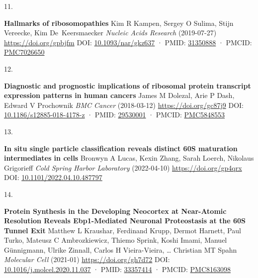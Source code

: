 \documentclass[
]{article}
\newlength{\cslhangindent}
\newlength{\csllabelwidth}
\newlength{\cslentryspacingunit} %
\newenvironment{CSLReferences}[2] %
 {%
  \setlength{\parindent}{0pt}
  \ifodd #1
  \let\oldpar\par
  \def\par{\hangindent=\cslhangindent\oldpar}
  \fi
  \setlength{\parskip}{#2\cslentryspacingunit}
 }%
 {}
\newcommand{\CSLBlock}[1]{#1\hfill\break}
\newcommand{\CSLLeftMargin}[1]{\parbox[t]{\csllabelwidth}{#1}}
\newcommand{\CSLRightInline}[1]{\parbox[t]{\linewidth - \csllabelwidth}{#1}\break}
\providecommand{\DIFaddbegin}{} %
\providecommand{\DIFaddend}{} %
\providecommand{\DIFdelbegin}{} %
\providecommand{\DIFdelend}{} %
\newcommand{\DIFscaledelfig}{0.5}
\newlength{\DIFdelgraphicswidth} %
\newlength{\DIFdelgraphicsheight} %
\newcommand{\DIFaddincludegraphics}[2][]{{\color{blue}\fbox{\DIFOincludegraphics[#1]{#2}}}} %
\newcommand{\DIFdelincludegraphics}[2][]{%
\sbox{\DIFdelgraphicsbox}{\DIFOincludegraphics[#1]{#2}}%
\settoboxwidth{\DIFdelgraphicswidth}{\DIFdelgraphicsbox} %
\settoboxtotalheight{\DIFdelgraphicsheight}{\DIFdelgraphicsbox} %
\scalebox{\DIFscaledelfig}{%
\parbox[b]{\DIFdelgraphicswidth}{\usebox{\DIFdelgraphicsbox}\\[-\baselineskip] \rule{\DIFdelgraphicswidth}{0em}}\llap{\resizebox{\DIFdelgraphicswidth}{\DIFdelgraphicsheight}{%
\setlength{\unitlength}{\DIFdelgraphicswidth}%
\begin{picture}(1,1)%
\thicklines\linethickness{2pt} %
{\color[rgb]{1,0,0}\put(0,0){\framebox(1,1){}}}%
{\color[rgb]{1,0,0}\put(0,0){\line( 1,1){1}}}%
{\color[rgb]{1,0,0}\put(0,1){\line(1,-1){1}}}%
\end{picture}%
}\hspace*{3pt}}} %
} %
\DeclareRobustCommand{\DIFaddbegin}{\DIFOaddbegin \let\includegraphics\DIFaddincludegraphics} %
\DeclareRobustCommand{\DIFaddend}{\DIFOaddend \let\includegraphics\DIFOincludegraphics} %
\DeclareRobustCommand{\DIFdelbegin}{\DIFOdelbegin \let\includegraphics\DIFdelincludegraphics} %
\DeclareRobustCommand{\DIFdelend}{\DIFOaddend \let\includegraphics\DIFOincludegraphics} %
\begin{document}
\begin{CSLReferences}{0}{0}
\leavevmode{}%
\CSLLeftMargin{11. }%
\CSLRightInline{\textbf{Hallmarks of ribosomopathies}
\CSLBlock{Kim R Kampen, Sergey O Sulima, Stijn Vereecke, Kim De~Keersmaecker} \emph{Nucleic Acids Research} (2019-07-27) \url{https://doi.org/gpbjfm}
\CSLBlock{DOI: \href{https://doi.org/10.1093/nar/gkz637}{10.1093/nar/gkz637} · PMID: \href{https://www.ncbi.nlm.nih.gov/pubmed/31350888}{31350888} · PMCID: \href{https://www.ncbi.nlm.nih.gov/pmc/articles/PMC7026650}{PMC7026650}}}

\leavevmode{}%
\CSLLeftMargin{12. }%
\CSLRightInline{\textbf{Diagnostic and prognostic implications of ribosomal protein transcript expression patterns in human cancers}
\CSLBlock{James M Dolezal, Arie P Dash, Edward V Prochownik} \emph{BMC Cancer} (2018-03-12) \url{https://doi.org/gc87j9}
\CSLBlock{DOI: \href{https://doi.org/10.1186/s12885-018-4178-z}{10.1186/s12885-018-4178-z} · PMID: \href{https://www.ncbi.nlm.nih.gov/pubmed/29530001}{29530001} · PMCID: \href{https://www.ncbi.nlm.nih.gov/pmc/articles/PMC5848553}{PMC5848553}}}

\leavevmode{}%
\CSLLeftMargin{13. }%
\DIFdelbegin %
\DIFdelend \DIFaddbegin \CSLRightInline{\textbf{ In situ single particle classification reveals distinct 60S maturation intermediates in cells}
\CSLBlock{Bronwyn A Lucas, Kexin Zhang, Sarah Loerch, Nikolaus Grigorieff} \emph{Cold Spring Harbor Laboratory} (2022-04-10) \url{https://doi.org/gp4qrx}
\CSLBlock{DOI: \href{https://doi.org/10.1101/2022.04.10.487797}{10.1101/2022.04.10.487797}}}
\DIFaddend 

\leavevmode{}%
\CSLLeftMargin{14. }%
\CSLRightInline{\textbf{Protein Synthesis in the Developing Neocortex at Near-Atomic Resolution Reveals Ebp1-Mediated Neuronal Proteostasis at the 60S Tunnel Exit}
\CSLBlock{Matthew L Kraushar, Ferdinand Krupp, Dermot Harnett, Paul Turko, Mateusz C Ambrozkiewicz, Thiemo Sprink, Koshi Imami, Manuel Günnigmann, Ulrike Zinnall, Carlos H Vieira-Vieira, \ldots{} Christian MT Spahn} \emph{Molecular Cell} (2021-01) \url{https://doi.org/gh7d72}
\CSLBlock{DOI: \href{https://doi.org/10.1016/j.molcel.2020.11.037}{10.1016/j.molcel.2020.11.037} · PMID: \href{https://www.ncbi.nlm.nih.gov/pubmed/33357414}{33357414} · PMCID: \href{https://www.ncbi.nlm.nih.gov/pmc/articles/PMC8163098}{PMC8163098}}}


\end{CSLReferences}
\end{document}
